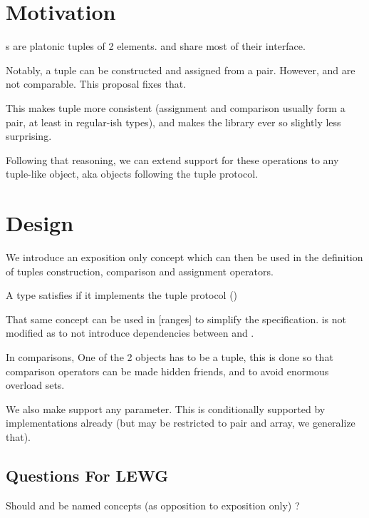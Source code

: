 \documentclass{wg21}
\begin{document}
\section{Motivation}

s are platonic tuples of 2 elements.  and  share
most of their interface.

Notably, a tuple can be constructed and assigned from a pair.
However,  and  are not comparable.
This proposal fixes that.

This makes tuple more consistent (assignment and comparison usually form a pair, at least in regular-ish types),
and makes the library ever so slightly less surprising.

Following that reasoning, we can extend support for these operations to any tuple-like object, aka objects following
the tuple protocol.
 
\section{Design}

We introduce an exposition only concept  which can then be used in the definition of tuples construction,
comparison and assignment operators.

A type satisfies  if it implements the tuple protocol ()

That same concept can be used in [ranges] to simplify the specification.
 is not modified as to not introduce dependencies between  and .

In comparisons, One of the 2 objects has to be a tuple, this is done so that comparison operators can be made
hidden friends, and to avoid enormous overload sets.

We also make  support any  parameter.
This is conditionally supported by implementations already (but may be restricted to pair and array, we generalize that).


\subsection{Questions For LEWG}

Should  and  be named concepts (as opposition to exposition only) ?
\end{document}
